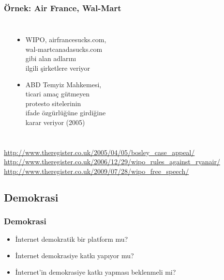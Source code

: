 \documentclass[dvipsnames]{beamer}
\theoremstyle{plain}
\begin{document}
\begin{frame}
  \frametitle{Örnek: Air France, Wal-Mart}

  \begin{columns}
    \begin{center}
    \end{center}

    \begin{itemize}
      \item WIPO, airfrancesucks.com,\\
        wal-martcanadasucks.com\\
        gibi alan adlarını\\
        ilgili şirketlere veriyor
      \item ABD Temyiz Mahkemesi,\\
        ticari amaç gütmeyen\\
        protesto sitelerinin\\
        ifade özgürlüğüne girdiğine\\
        karar veriyor (2005)
    \end{itemize}
  \end{columns}

  \medskip
  \tiny{\url{http://www.theregister.co.uk/2005/04/05/bosley_case_appeal/}}\\
  \tiny{\url{http://www.theregister.co.uk/2006/12/29/wipo_rules_against_ryanair/}}\\
  \tiny{\url{http://www.theregister.co.uk/2009/07/28/wipo_free_speech/}}\\
\end{frame}

\subsection{Demokrasi}

\begin{frame}
  \frametitle{Demokrasi}

  \begin{itemize}
    \item İnternet demokratik bir platform mu?
    \item İnternet demokrasiye katkı yapıyor mu?
    \item İnternet'in demokrasiye katkı yapması beklenmeli mi?
  \end{itemize}
\end{frame}
\end{document}
